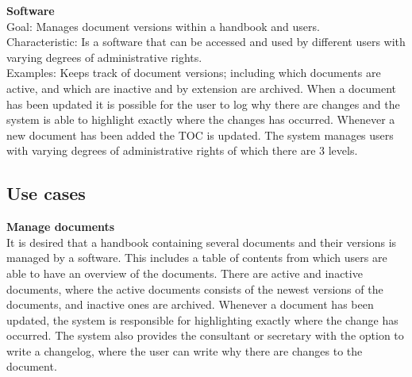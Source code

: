 \textbf{Software}
\\%
Goal: Manages document versions within a handbook and users.
\\
Characteristic: Is a software that can be accessed and used by different users with varying degrees of administrative rights.
\\
Examples: Keeps track of document versions; including which documents are active, and which are inactive and by extension are archived. 
When a document has been updated it is possible for the user to log why there are changes and the system is able to highlight exactly where the changes has occurred.
Whenever a new document has been added the TOC is updated.
The system manages users with varying degrees of administrative rights of which there are 3 levels.


\subsection{Use cases}

\textbf{Manage documents}
\\
It is desired that a handbook containing several documents and their versions is managed by a software. 
This includes a table of contents from which users are able to have an overview of the documents. 
There are active and inactive documents, where the active documents consists of the newest versions of the documents, and inactive ones are archived. 
Whenever a document has been updated, the system is responsible for highlighting exactly where the change has occurred. 
The system also provides the consultant or secretary with the option to write a changelog, where the user can write why there are changes to the document.

